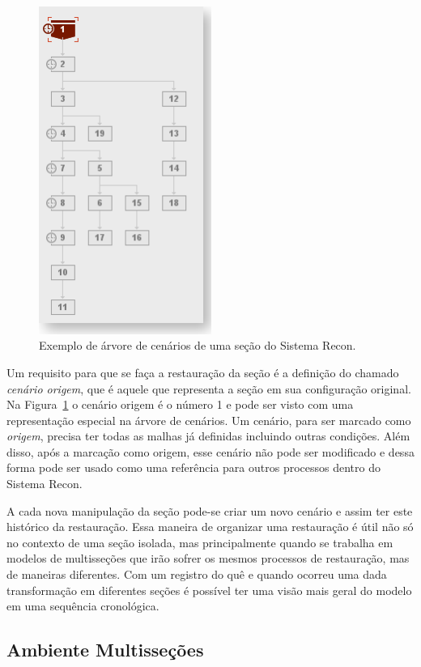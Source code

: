 \begin{figure} [H]
  \begin{center}
    \includegraphics[width=160pt]{images/fig-recon-6}
    \caption{Exemplo de árvore de cenários de uma seção do Sistema Recon.}\label{fig-recon-6}
  \end{center}
\end{figure}

Um requisito para que se faça a restauração da seção é a definição do chamado \emph{cenário origem}, que é aquele que representa a seção em sua configuração original. Na Figura~\ref{fig-recon-6} o cenário origem é o número 1 e pode ser visto com uma representação especial na árvore de cenários. Um cenário, para ser marcado como \emph{origem}, precisa ter todas as malhas já definidas incluindo outras condições. Além disso, após a marcação como origem, esse cenário não pode ser modificado e dessa forma pode ser usado como uma referência para outros processos dentro do Sistema Recon.

A cada nova manipulação da seção pode-se criar um novo cenário e assim ter este histórico da restauração. Essa maneira de organizar uma restauração é útil não só no contexto de uma seção isolada, mas principalmente quando se trabalha em modelos de multisseções que irão sofrer os mesmos processos de restauração, mas de maneiras diferentes. Com um registro do quê e quando ocorreu uma dada transformação em diferentes seções é possível ter uma visão mais geral do modelo em uma sequência cronológica.

\subsection{Ambiente Multisseções}

